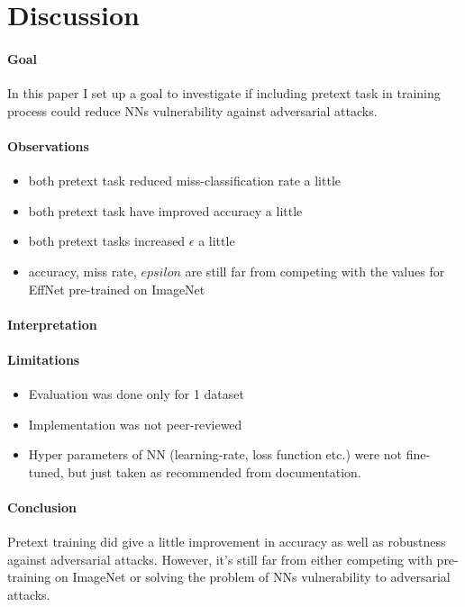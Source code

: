 \section{Discussion}

\paragraph{Goal}
In this paper I set up a goal to investigate if including pretext task in training process could reduce NNs
vulnerability against adversarial attacks.

\paragraph{Observations}
\begin{itemize}
    \item both pretext task reduced miss-classification rate a little
    \item both pretext task have improved accuracy a little
    \item both pretext tasks increased $\epsilon$ a little
    \item accuracy, miss rate, $epsilon$ are still far from competing with the values for EffNet pre-trained on ImageNet
\end{itemize}

\paragraph{Interpretation}

\paragraph{Limitations}
\begin{itemize}
    \item Evaluation was done only for 1 dataset
    \item Implementation was not peer-reviewed
    \item Hyper parameters of NN (learning-rate, loss function etc.) were not fine-tuned,
    but just taken as recommended from documentation.
\end{itemize}

\paragraph{Conclusion}
Pretext training did give a little improvement in accuracy as well as robustness against adversarial attacks.
However, it's still far from either competing with pre-training on ImageNet or solving the problem of NNs vulnerability
to adversarial attacks.


